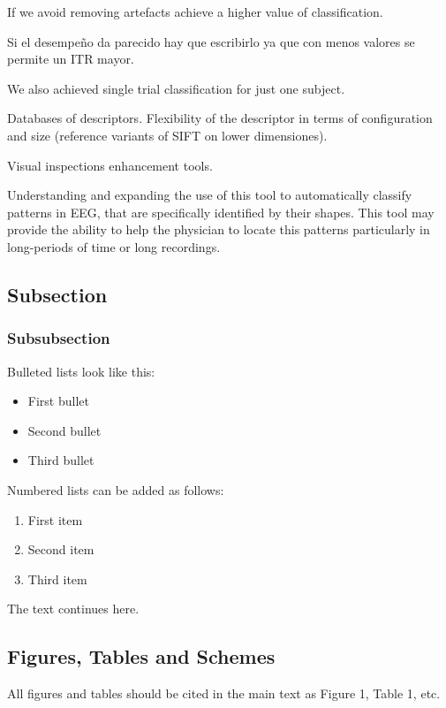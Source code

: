 \documentclass[entropy,article,submit,moreauthors,pdftex,10pt,a4paper]{mdpi}
\begin{document}
If we avoid removing artefacts achieve a higher value of classification.

Si el desempeño da parecido hay que escribirlo ya que con menos valores se permite un ITR mayor.

We also achieved single trial classification for just one subject.

Databases of descriptors.  Flexibility of the descriptor in terms of configuration and size (reference variants of SIFT on lower dimensiones).

Visual inspections enhancement tools.

Understanding and expanding the use of this tool to automatically classify patterns in EEG, that are specifically identified by their shapes.  This tool may provide the ability to help the physician to locate this patterns particularly in long-periods of time or long recordings. 
\citep{Hartman2005}

\subsection{Subsection}

\subsubsection{Subsubsection}

Bulleted lists look like this:
\begin{itemize}[leftmargin=*,labelsep=4mm]
\item	First bullet
\item	Second bullet
\item	Third bullet
\end{itemize}

Numbered lists can be added as follows:
\begin{enumerate}[leftmargin=*,labelsep=3mm]
\item	First item
\item	Second item
\item	Third item
\end{enumerate}

The text continues here.

\subsection{Figures, Tables and Schemes}

All figures and tables should be cited in the main text as Figure 1, Table 1, etc.
\end{document}
